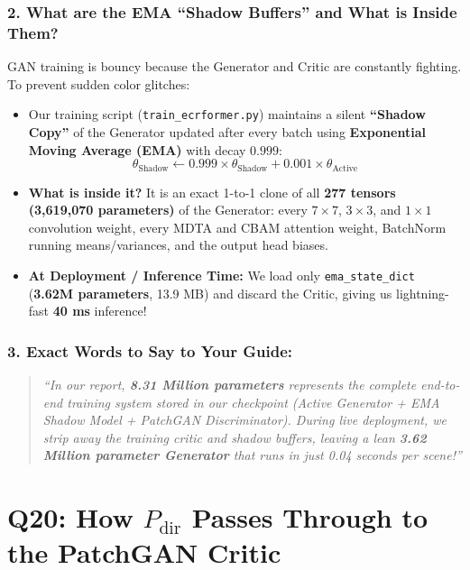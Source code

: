 \documentclass[11pt,a4paper]{article}
\begin{document}
\subsubsection*{2. What are the EMA ``Shadow Buffers'' and What is Inside Them?}
GAN training is bouncy because the Generator and Critic are constantly fighting. To prevent sudden color glitches:
\begin{itemize}[leftmargin=1.5em]
    \item Our training script (\texttt{train\_ecrformer.py}) maintains a silent \textbf{``Shadow Copy''} of the Generator updated after every batch using \textbf{Exponential Moving Average (EMA)} with decay $0.999$:
    $$\theta_{\text{Shadow}} \longleftarrow \mathbf{0.999} \times \theta_{\text{Shadow}} + \mathbf{0.001} \times \theta_{\text{Active}}$$
    \item \textbf{What is inside it?} It is an exact 1-to-1 clone of all \textbf{277 tensors (3,619,070 parameters)} of the Generator: every $7\times 7$, $3\times 3$, and $1\times 1$ convolution weight, every MDTA and CBAM attention weight, BatchNorm running means/variances, and the output head biases.
    \item \textbf{At Deployment / Inference Time:} We load only \texttt{ema\_state\_dict} (\textbf{3.62M parameters}, 13.9 MB) and discard the Critic, giving us lightning-fast \textbf{40 ms} inference!
\end{itemize}

\subsubsection*{3. Exact Words to Say to Your Guide:}
\begin{quote}
\textit{``In our report, \textbf{8.31 Million parameters} represents the complete end-to-end training system stored in our checkpoint (Active Generator + EMA Shadow Model + PatchGAN Discriminator). During live deployment, we strip away the training critic and shadow buffers, leaving a lean \textbf{3.62 Million parameter Generator} that runs in just 0.04 seconds per scene!''}
\end{quote}

\newpage

\section{Q20: How $P_{\text{dir}}$ Passes Through to the PatchGAN Critic}
\end{document}
